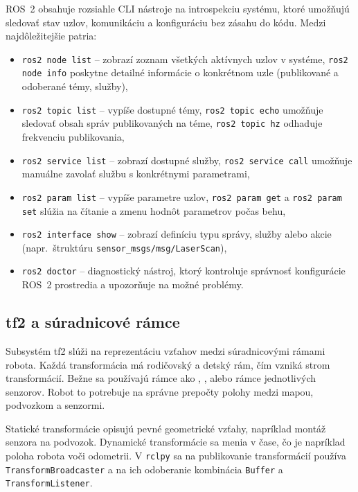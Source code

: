         ROS~2 obsahuje rozsiahle CLI nástroje na introspekciu systému, ktoré umožňujú sledovať stav uzlov, komunikáciu a konfiguráciu bez zásahu do kódu. Medzi najdôležitejšie patria:
        \begin{itemize}
            \item \texttt{ros2 node list} -- zobrazí zoznam všetkých aktívnych uzlov v systéme, \texttt{ros2 node info} poskytne detailné informácie o konkrétnom uzle (publikované a odoberané témy, služby),
            
            \item \texttt{ros2 topic list} -- vypíše dostupné témy, \texttt{ros2 topic echo} umožňuje sledovať obsah správ publikovaných na téme, \texttt{ros2 topic hz} odhaduje frekvenciu publikovania,
            
            \item \texttt{ros2 service list} -- zobrazí dostupné služby, \texttt{ros2 service call} umožňuje manuálne zavolať službu s konkrétnymi parametrami,
            
            \item \texttt{ros2 param list} -- vypíše parametre uzlov, \texttt{ros2 param get} a \texttt{ros2 param set} slúžia na čítanie a zmenu hodnôt parametrov počas behu,
            
            \item \texttt{ros2 interface show} -- zobrazí definíciu typu správy, služby alebo akcie (napr.\ štruktúru \texttt{sensor\_msgs/msg/LaserScan}),
            
            \item \texttt{ros2 doctor} -- diagnostický nástroj, ktorý kontroluje správnosť konfigurácie ROS~2 prostredia a upozorňuje na možné problémy.
        \end{itemize}
      
        \subsection*{tf2 a súradnicové rámce}
      
        Subsystém tf2 slúži na reprezentáciu vzťahov medzi súradnicovými rámami robota. Každá transformácia má rodičovský a detský rám, čím vzniká strom transformácií. Bežne sa používajú rámce ako , ,  alebo rámce jednotlivých senzorov. Robot to potrebuje na správne prepočty polohy medzi mapou, podvozkom a senzormi.
      
        Statické transformácie opisujú pevné geometrické vzťahy, napríklad montáž senzora na podvozok. Dynamické transformácie sa menia v čase, čo je napríklad poloha robota voči odometrii. V \texttt{rclpy} sa na publikovanie transformácií používa \texttt{TransformBroadcaster} a na ich odoberanie kombinácia \texttt{Buffer} a \texttt{TransformListener}.
      
